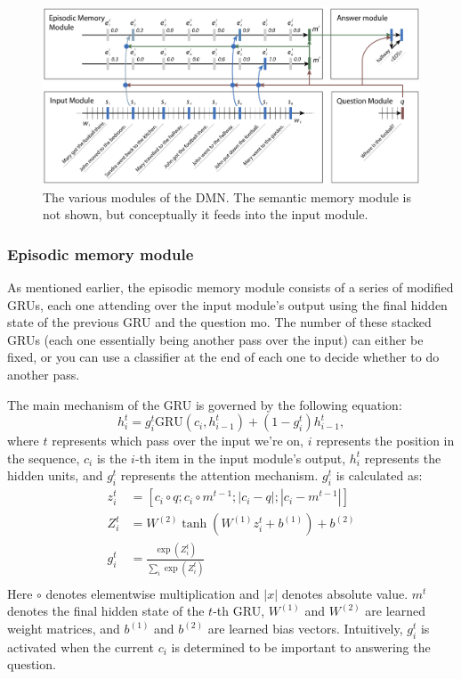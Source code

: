 \begin{figure} 
\centering
\includegraphics[scale=0.3]{dmn_arch.png}
\caption{The various modules of the DMN. The semantic memory module is not shown, but conceptually it feeds into the input module.}\label{dmn_arch}
\end{figure}

\subsubsection{Episodic memory module}
As mentioned earlier, the episodic memory module consists of a series of modified GRUs, each one attending over the input module's output using the final hidden state of the previous GRU and the question mo. The number of these stacked GRUs (each one essentially being another pass over the input) can either be fixed, or you can use a classifier at the end of each one to decide whether to do another pass.

The main mechanism of the GRU is governed by the following equation:
$$h_i^t = g_i^t\text{GRU}\left(c_i, h_{i-1}^t\right) + (1 - g_i^t)h_{i-1}^t,$$
where $t$ represents which pass over the input we're on, $i$ represents the position in the sequence, $c_i$ is the $i$-th item in the input module's output, $h_i^t$ represents the hidden units, and $g_i^t$ represents the attention mechanism. $g_i^t$ is calculated as:
\begin{align*}
z_i^t &= \left[c_i \circ q; c_i \circ m^{t-1}; \left| c_i - q\right|; \left| c_i - m^{t-1}\right|\right]\\
Z_i^t &= W^{(2)}\tanh\left(W^{(1)}z_i^t + b^{(1)}\right) + b^{(2)}\\
g_i^t &= \frac{\exp\left(Z_i^t\right)}{\sum_i \exp\left(Z_i^t\right)}\\
\end{align*}
Here $\circ$ denotes elementwise multiplication and $|x|$ denotes absolute value. $m^{t}$ denotes the final hidden state of the $t$-th GRU, $W^{(1)}$ and $W^{(2)}$ are learned weight matrices, and $b^{(1)}$ and $b^{(2)}$ are learned bias vectors. Intuitively, $g_i^t$ is activated when the current $c_i$ is determined to be important to answering the question.

